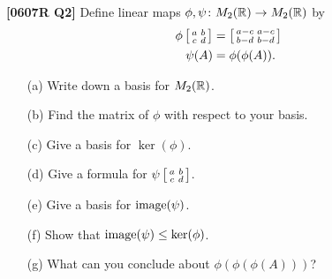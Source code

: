 \documentclass[a4paper]{article}
\begin{document}
 \begin{problem}\textbf{[0607R Q2]}
 Define linear maps $\phi,\psi\colon M_2({\mathbb{R}})\to M_2({\mathbb{R}})$ by
 \begin{align*}
  \phi\left[\begin{smallmatrix} a & b \\ c & d \end{smallmatrix}\right] &=
    \left[\begin{smallmatrix} a-c & a-c \\ b-d & b-d \end{smallmatrix}\right] \\
  \psi(A) &= \phi(\phi(A)).
 \end{align*}
 \begin{itemize}
  \item[(a)] Write down a basis for $M_2({\mathbb{R}})$. 
  \item[(b)] Find the matrix of $\phi$ with respect to your basis. 
  \item[(c)] Give a basis for $\ker(\phi)$. 
  \item[(d)] Give a formula for $\psi\left[\begin{smallmatrix} a&b\\ c&d\end{smallmatrix}\right]$. 
  \item[(e)] Give a basis for $\operatorname{image}(\psi)$.  
  \item[(f)] Show that $\operatorname{image}(\psi)\leq\ker(\phi)$. 
  \item[(g)] What can you conclude about $\phi(\phi(\phi(A)))$? 
 \end{itemize}
\end{problem}
\end{document}
